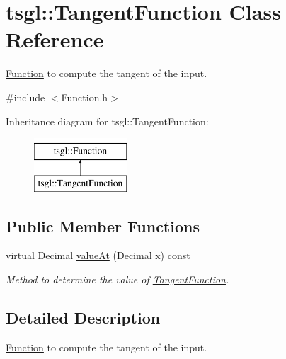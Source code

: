 \hypertarget{classtsgl_1_1_tangent_function}{\section{tsgl\-:\-:\-Tangent\-Function \-Class \-Reference}
\label{classtsgl_1_1_tangent_function}
}


\hyperlink{classtsgl_1_1_function}{\-Function} to compute the tangent of the input.  




{\ttfamily \#include $<$\-Function.\-h$>$}

\-Inheritance diagram for tsgl\-:\-:\-Tangent\-Function\-:\begin{figure}[H]
\begin{center}
\leavevmode
\includegraphics[height=2.000000cm]{classtsgl_1_1_tangent_function}
\end{center}
\end{figure}
\subsection*{\-Public \-Member \-Functions}
\begin{DoxyCompactItemize}
\item 
virtual \-Decimal \hyperlink{classtsgl_1_1_tangent_function_a3737542399069ebce368a5b53ba8a563}{value\-At} (\-Decimal x) const 
\begin{DoxyCompactList}\small\item\em \-Method to determine the value of \hyperlink{classtsgl_1_1_tangent_function}{\-Tangent\-Function}. \end{DoxyCompactList}\end{DoxyCompactItemize}


\subsection{\-Detailed \-Description}
\hyperlink{classtsgl_1_1_function}{\-Function} to compute the tangent of the input. 

